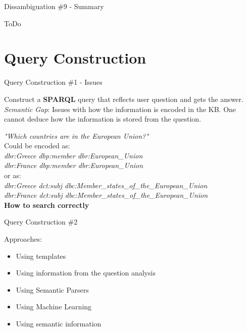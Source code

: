 \documentclass{beamer}
\begin{document}
\begin{frame}{Dissambiguation \#9 - Summary}
  \begin{card}
    ToDo
  \end{card}
\end{frame}

\section{Query Construction}

\begin{frame}{Query Construction \#1 - Issues}
  \begin{cardTiny}
    Construct a \textbf{SPARQL} query that reflects user question and gets the answer. \\
    \textit{Semantic Gap}: Issues with how the information is encoded in the KB\@. One cannot deduce how the information is stored from the question.
  \end{cardTiny}
  \begin{cardTiny}
    \textit{"Which countries are in the European Union?"} \\
    Could be encoded as: \\
    \textit{dbr:Greece dbp:member dbr:European\_Union} \\
    \textit{dbr:France dbp:member dbr:European\_Union} \\
    or as: \\
    \textit{dbr:Greece dct:subj dbc:Member\_states\_of\_the\_European\_Union} \\
    \textit{dbr:France dct:subj dbc:Member\_states\_of\_the\_European\_Union} \\
    \textbf{How to search correctly}
  \end{cardTiny}
\end{frame}

\begin{frame}{Query Construction \#2}
  \begin{card}
    Approaches:
    \begin{itemize}
      \item Using templates
      \item Using information from the question analysis
      \item Using Semantic Parsers
      \item Using Machine Learning
      \item Using semantic information
    \end{itemize}
  \end{card}
\end{frame}
\end{document}
